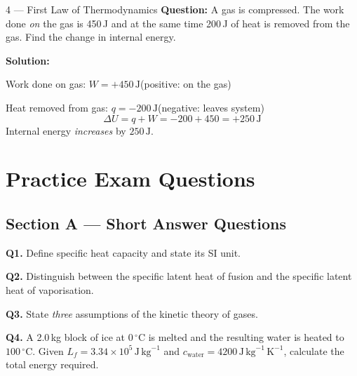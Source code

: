 \begin{examplebox}{4 — First Law of Thermodynamics}
\textbf{Question:} A gas is compressed. The work done \emph{on} the gas is 450\,J and
at the same time 200\,J of heat is removed from the gas. Find the change in internal
energy.

\medskip\textbf{Solution:}

Work done on gas: $W = +450\,\mathrm{J}$\quad (positive: on the gas)

Heat removed from gas: $q = -200\,\mathrm{J}$\quad (negative: leaves system)
\[
  \Delta U = q + W = -200 + 450 = +250\,\mathrm{J}
\]
Internal energy \emph{increases} by $250\,\mathrm{J}$.
\end{examplebox}

\newpage
\section{Practice Exam Questions}

\subsection*{Section A — Short Answer Questions}

\noindent\begin{minipage}{\textwidth}
\textbf{Q1.} Define specific heat capacity and state its SI unit.
\end{minipage}

\bigskip
\noindent\begin{minipage}{\textwidth}
\textbf{Q2.} Distinguish between the specific latent heat of fusion and the specific
latent heat of vaporisation.
\end{minipage}

\bigskip
\noindent\begin{minipage}{\textwidth}
\textbf{Q3.} State \emph{three} assumptions of the kinetic theory of gases.
\end{minipage}

\bigskip
\noindent\begin{minipage}{\textwidth}
\textbf{Q4.} A 2.0\,kg block of ice at $0\,{}^{\circ}$C is melted and the resulting
water is heated to $100\,{}^{\circ}$C.
Given $L_f = 3.34\times10^5\,\mathrm{J\,kg}^{-1}$ and
$c_{\mathrm{water}} = 4200\,\mathrm{J\,kg}^{-1}\,\mathrm{K}^{-1}$, calculate the
total energy required.
\end{minipage}

